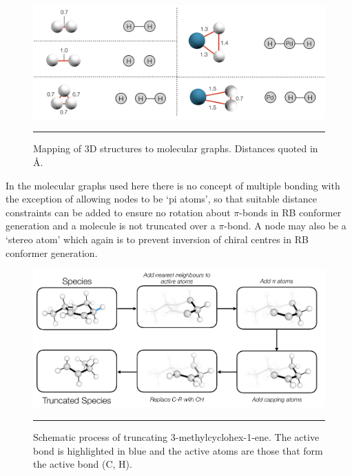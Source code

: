 \documentclass[../../main.tex]{subfiles}
\begin{document}
\begin{figure}[h!]
	\vspace{0.4cm}
	\centering
	\includegraphics[width=14cm]{5/autode/figs/figS7}
	\vspace{0.4cm}
	\hrule
	\caption{Mapping of 3D structures to molecular graphs. Distances quoted in \AA.}
	\label{fig::ade_si_7}
\end{figure}


In the molecular graphs used here there is no concept of multiple bonding with the exception of allowing nodes to be ‘pi atoms’, so that suitable distance constraints can be added to ensure no rotation about $\pi$-bonds in RB conformer generation and a molecule is not truncated over a $\pi$-bond. A node may also be a ‘stereo atom’ which again is to prevent inversion of chiral centres in RB conformer generation.



\begin{figure}[h!]
	\vspace{0.4cm}
	\centering
	\includegraphics[width=14cm]{5/autode/figs/figS8}
	\vspace{0.4cm}
	\hrule
	\caption{Schematic process of truncating 3-methylcyclohex-1-ene. The active bond is highlighted in blue and the active atoms are those that form the active bond (C, H).}
	\label{fig::ade_si_8}
\end{figure}
\end{document}
